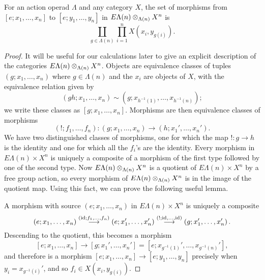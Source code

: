 





\begin{prop}\label{prop:hom-set-lemma}
For an action operad $\Lambda$ and any category $X$, the set of morphisms from $[e; x_1, \ldots, x_n]$ to $[e; y_1, \ldots, y_n]$ in $E\Lambda(n) \otimes_{\Lambda(n)} X^{n}$ is
  \[
    \coprod_{g \in \Lambda(n)} \prod_{i=1}^{n} X\left(x_i, y_{g(i)}\right).
  \]
\end{prop}
\begin{proof}
It will be useful for our calculations later to give an explicit description of the categories $E\Lambda(n) \otimes_{\Lambda(n)} X^{n}$. Objects are equivalence classes of tuples $(g; x_1, \ldots, x_n)$ where $g \in \Lambda(n)$ and the $x_{i}$ are objects of $X$, with the equivalence relation given by
  \[
    (gh; x_1, \ldots, x_n) \sim \left(g; x_{h^{-1}(1)}, \ldots, x_{h^{-1}(n)}\right);
  \]
  we write these classes as $[g; x_1, \ldots, x_n]$. Morphisms are then equivalence classes of morphisms
  \[
    (!; f_1, \ldots, f_n) \colon  (g; x_1, \ldots, x_n) \rightarrow \left(h; x_1', \ldots, x_n'\right).
  \]
We have two distinguished classes of morphisms, one for which the map $! \colon  g \rightarrow h$ is the identity and one for which all the $f_{i}$'s are the identity. Every morphism in $E\Lambda(n) \times X^{n}$ is uniquely a composite of a  morphism of the first type followed by one of the second type. Now $E\Lambda(n) \otimes_{\Lambda(n)} X^{n}$ is a quotient of $E\Lambda(n) \times X^{n}$ by a free group action, so every morphism of $E\Lambda(n) \otimes_{\Lambda(n)} X^{n}$ is in the image of the quotient map. Using this fact, we can prove the following useful lemma.

A morphism with source $(e; x_1, \ldots, x_n)$ in $E\Lambda(n) \times X^{n}$ is uniquely a composite
  \[
    (e; x_1, \ldots, x_n) \stackrel{(\textrm{id}; f_{1}, \ldots, f_{n})}{\longrightarrow} \left(e; x_1', \ldots, x_n'\right) \stackrel{(!; \textrm{id}, \ldots, \textrm{id})}{\longrightarrow} \left(g; x_1', \ldots, x_n'\right).
  \]
Descending to the quotient, this becomes a morphism
  \[
    [e; x_1, \ldots, x_n] \rightarrow \left[g; x_1', \ldots, x_n'\right] = \left[e; x_{g^{-1}(1)}', \ldots, x_{g^{-1}(n)}'\right],
  \]
and therefore is a morphism $[e; x_1, \ldots, x_n] \rightarrow [e; y_1, \ldots, y_n]$ precisely when $y_i = x_{g^{-1}(i)}'$, and so $f_i \in   X(x_i, y_{g(i)})$.
\end{proof}

